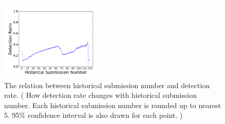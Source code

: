 

\begin{figure}[t!]
\begin{center}
\includegraphics[width=2in]{figure/SubNum}
\caption{
The relation between historical submission number and detection rate.
(
How detection rate changes with historical submission number. 
Each historical submission number is rounded up to nearest 5.
95\% confidence interval is also drawn for each point.
)	
}
\label{fig:hisnum}
\end{center}
\end{figure}


